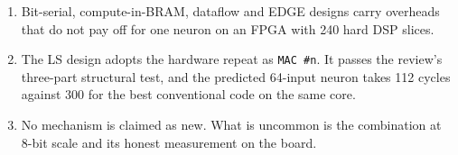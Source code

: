 \begin{titlepage}
\begin{tcolorbox}[lsbase,breakable=false,colback=lspaper,borderline west={3pt}{0pt}{lsamber}]
\begin{enumerate}[leftmargin=1.4em,itemsep=0.1em]
\item Bit-serial, compute-in-BRAM, dataflow and EDGE designs carry overheads that do not pay off for one neuron on an FPGA with 240 hard DSP slices.
\item The LS design adopts the hardware repeat as \texttt{MAC \#n}. It passes the review's three-part structural test, and the predicted 64-input neuron takes 112 cycles against 300 for the best conventional code on the same core.
\item No mechanism is claimed as new. What is uncommon is the combination at 8-bit scale and its honest measurement on the board.
\end{enumerate}
\end{tcolorbox}
\restoregeometry
\end{titlepage}
